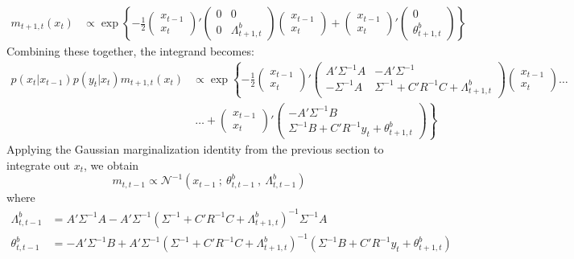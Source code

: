 \documentclass{article} %
\begin{document}
\begin{align*}
m_{t+1,t}(x_t)&\propto\exp\left\{-\frac{1}{2}\begin{pmatrix}x_{t-1}\\x_t\end{pmatrix}'\begin{pmatrix}0 & 0\\0 & \Lambda^b_{t+1,t}\end{pmatrix}\begin{pmatrix}x_{t-1}\\x_t\end{pmatrix} + \begin{pmatrix}x_{t-1}\\x_t\end{pmatrix}'\begin{pmatrix}0\\ \theta^b_{t+1,t}\end{pmatrix}\right\}
\end{align*}
Combining these together, the integrand becomes:
\begin{align*}
p(x_t|x_{t-1})p(y_t|x_t)m_{t+1,t}(x_t)&\propto\exp\left\{-\frac{1}{2}\begin{pmatrix}x_{t-1}\\x_t\end{pmatrix}'\begin{pmatrix}A'\Sigma^{-1}A & -A'\Sigma^{-1}\\-\Sigma^{-1}A & \Sigma^{-1}+C'R^{-1}C+\Lambda^b_{t+1,t}\end{pmatrix}\begin{pmatrix}x_{t-1}\\x_t\end{pmatrix}\right.\ldots\\
&\left. ~\ldots + \begin{pmatrix}x_{t-1}\\x_t\end{pmatrix}'\begin{pmatrix}-A'\Sigma^{-1}B\\ \Sigma^{-1}B+C'R^{-1}y_t+\theta^b_{t+1,t}\end{pmatrix}\right\}
\end{align*}
Applying the Gaussian marginalization identity from the previous section to integrate out $x_t$, we obtain
\[m_{t,t-1}\propto\mathcal{N}^{-1}(x_{t-1}~;~\theta^b_{t,t-1}~,~\Lambda^b_{t,t-1})\]
where
\begin{align*}
\Lambda^b_{t,t-1} &= A'\Sigma^{-1}A - A'\Sigma^{-1}(\Sigma^{-1}+C'R^{-1}C+\Lambda^b_{t+1,t})^{-1}\Sigma^{-1}A\\
\theta^b_{t,t-1} &= -A'\Sigma^{-1}B +A'\Sigma^{-1}(\Sigma^{-1}+C'R^{-1}C+\Lambda^b_{t+1,t})^{-1}(\Sigma^{-1}B+C'R^{-1}y_t+\theta^b_{t+1,t})
\end{align*}
\end{document}
